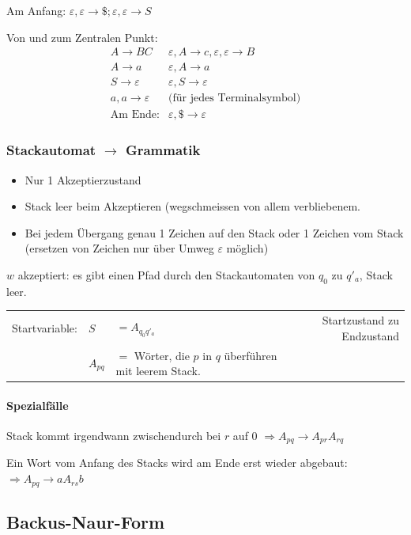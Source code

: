 Am Anfang: $\varepsilon, \varepsilon \to \$; \varepsilon, \varepsilon \to S$


Von und zum Zentralen Punkt: 
\begin{align*}
A \to BC & \varepsilon, A \to c, \varepsilon, \varepsilon \to B \\
A \to a & \varepsilon, A \to a \\
S \to \varepsilon & \varepsilon, S \to \varepsilon \\
a, a \to \varepsilon & \text{(für jedes Terminalsymbol)} \\
\text{Am Ende:} & \varepsilon, \$ \to \varepsilon 
\end{align*}

\subsubsection{Stackautomat $\to$ Grammatik}

\begin{itemize}
	 \item Nur 1 Akzeptierzustand
	 \item Stack leer beim Akzeptieren (wegschmeissen von allem verbliebenem.
	 \item Bei jedem Übergang genau 1 Zeichen auf den Stack oder 1 Zeichen vom Stack (ersetzen von Zeichen nur über Umweg $\varepsilon$ möglich)
\end{itemize}

$w$ akzeptiert: es gibt einen Pfad durch den Stackautomaten von $q_0$ zu $q'_a$, Stack leer.

\begin{tabular}{l l l r}
	Startvariable: & $S$&$=A_{q_0 q'_a}$ &Startzustand zu Endzustand \\
	& $A_{pq}$&$= $ Wörter, die $p$ in $q$ überführen mit leerem Stack.
\end{tabular}

\paragraph{Spezialfälle}

Stack kommt irgendwann zwischendurch bei $r$ auf 0 $\Rightarrow A_{pq} \to A_{pr} A_{rq}$

Ein Wort vom Anfang des Stacks wird am Ende erst wieder abgebaut: $\Rightarrow A_{pq} \to a A_{rs} b$

\subsection{Backus-Naur-Form}

